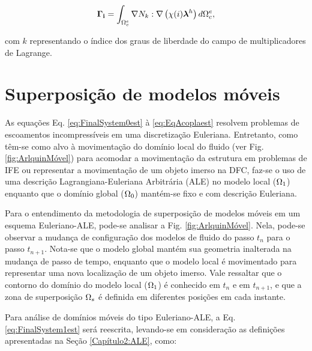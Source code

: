 \documentclass[tese_patricia]{subfiles}
\begin{document}
\begin{align}
	\mathbf{\Gamma_{i}} = \int_{\Omega_{c}^{e}} \nabla N_{k} : \nabla \left(\chi (i) \boldsymbol{\lambda}^h\right)    d\Omega_{c}^{e},
\end{align}


\noindent com $k$ representando o índice dos graus de liberdade do campo de multiplicadores de Lagrange.


\section{Superposição de modelos móveis}

As equações Eq. \ref{eq:FinalSystem0est} à \ref{eq:EqAcoplaest} resolvem problemas de escoamentos incompressíveis em uma discretização Euleriana. Entretanto, como têm-se como alvo à movimentação do domínio local do fluido (ver Fig. \ref{fig:ArlquinMóvel}) para acomodar a movimentação da estrutura em problemas de IFE ou representar a movimentação de um objeto imerso na DFC, faz-se o uso de uma descrição Lagrangiana-Euleriana Arbitrária (ALE) no modelo local ($\Omega_1$) enquanto que o domínio global ($\Omega_0$) mantém-se fixo e com descrição Euleriana. 

Para o entendimento da metodologia de superposição de modelos móveis em um esquema Euleriano-ALE, pode-se analisar a Fig. \ref{fig:ArlquinMóvel}. Nela, pode-se observar a mudança de configuração dos modelos de fluido do passo $t_n$ para o passo $t_{n+1}$. Nota-se que o modelo global mantém sua geometria inalterada na mudança de passo de tempo, enquanto que o modelo local é movimentado para representar uma nova localização de um objeto imerso. Vale ressaltar que o contorno do domínio do modelo local ($\Omega_1$) é conhecido em $t_n$ e em $t_{n+1}$, e que a zona de superposição $\Omega_s$ é definida em diferentes posições em cada instante.


Para análise de domínios móveis do tipo Euleriano-ALE, a Eq. \ref{eq:FinalSystem1est} será reescrita, levando-se em consideração as definições apresentadas na Seção \ref{Capítulo2:ALE}, como:
\end{document}
